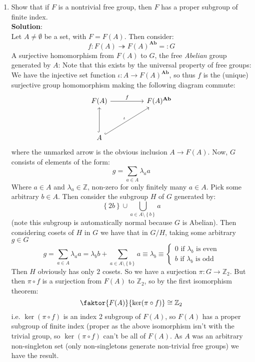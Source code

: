 \documentclass[12pt]{extarticle}
\newcommand{\ZZ}{\mathbb{Z}}
\newcommand{\set}[1]{\left\{ #1  \right\}}
\begin{document}
\begin{enumerate}[1)]
    \item Show that if \(F\) is a nontrivial free group, then \(F\) has a proper subgroup of finite index.\\
    
    \textbf{Solution}: \\
    Let \(A \neq \emptyset\) be a set, with \(F = F(A)\). Then consider:
    \[
    f \colon F(A) \twoheadrightarrow F(A)^{\textbf{Ab}} =:G
    \]
    A surjective homomorphism from \(F(A)\) to \(G\), the free \textit{Abelian} group generated by \(A\): Note that this exists by the universal property of free groups: We have the injective set function \(\iota \colon A \to F(A)^{\textbf{Ab}}\), so thus \(f\) is the (unique) surjective group homomorphism making the following diagram commute:
    \[
    \begin{tikzcd}
    F(A) \arrow[rr,"f"]  & &F(A)^{\textbf{Ab}} \\
        & & \\
        A \arrow[hookrightarrow,uu] \arrow[hookrightarrow,uurr,"\iota"] & &
    \end{tikzcd}
    \]
    where the unmarked arrow is the obvious inclusion \(A \to F(A)\). Now, \(G\) consists of elements of the form:
    \[
    g = \sum_{a \in A} \lambda_{a} a
    \]
    Where \(a \in A\) and \(\lambda_{a} \in \ZZ\), non-zero for only finitely many \(a \in A\). Pick some arbitrary \(b \in A\). Then consider the subgroup \(H\) of \(G\) generated by:
    \[
    \set{2 b} \cup \bigcup_{a \in A\setminus \set{b}} a
    \]
    (note this subgroup is automatically normal because \(G\) is Abelian). Then considering cosets of \(H\) in \(G\) we have that in \(G/H\), taking some arbitrary \(g \in G\)
    \[
    g = \sum_{a \in A} \lambda_{a} a = \lambda_{b} b + \sum_{a \in A \setminus \set{b}} a \equiv \lambda_{b} \equiv 
    \begin{cases}
    0 \text{ if \(\lambda_{b}\) is even}\\
    b \text{ if \(\lambda_{b}\) is odd}
    \end{cases}
    \]
    Then \(H\) obviously has only \(2\) cosets. So we have a surjection \(\pi \colon G \to \ZZ_{2}\). But then \(\pi \circ f\) is a surjection from \(F(A)\) to \(\ZZ_{2}\), so by the first isomorphism theorem:
    \[
    \faktor{F(A)}{\ker(\pi \circ f)} \cong \ZZ_{2}
    \]
    i.e. \(\ker(\pi \circ f)\) is an index 2 subgroup of \(F(A)\), so \(F(A)\) has a proper subgroup of finite index (proper as the above isomorphism isn't with the trivial group, so \(\ker(\pi \circ f)\) can't be all of \(F(A)\). As \(A\) was an arbitrary non-singleton set (only non-singletons generate non-trivial free groups) we have the result.
    \\
    

\end{enumerate}
\end{document}
